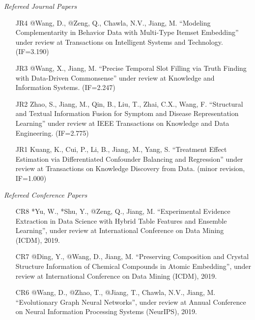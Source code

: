 \documentclass[10pt]{article}
\newenvironment{myindentpar}[1]%
{\begin{list}{}%
         {\setlength{\leftmargin}{#1}}%
         \item[]%
}
{\end{list}}
\newcounter{list}
\begin{document}
\begin{myindentpar}{0.00cm}

\hspace{-0.25cm}\emph{Refereed Journal Papers}

\begin{enumerate}[leftmargin=.5cm]

\item[JR4] @Wang, D., @Zeng, Q., Chawla, N.V., Jiang, M. ``Modeling Complementarity in Behavior Data with Multi-Type Itemset Embedding'' under review at Transactions on Intelligent Systems and Technology. (IF=3.190)

\item[JR3] @Wang, X., Jiang, M. ``Precise Temporal Slot Filling via Truth Finding with Data-Driven Commonsense'' under review at Knowledge and Information Systems. (IF=2.247)

\item[JR2] Zhao, S., Jiang, M., Qin, B., Liu, T., Zhai, C.X., Wang, F. ``Structural and Textual Information Fusion for Symptom and Disease Representation Learning'' under review at IEEE Transactions on Knowledge and Data Engineering. (IF=2.775)

\item[JR1] Kuang, K., Cui, P., Li, B., Jiang, M., Yang, S. ``Treatment Effect Estimation via Differentiated Confounder Balancing and Regression'' under review at Transactions on Knowledge Discovery from Data. (minor revision, IF=1.000)

\end{enumerate}

\vspace{.2cm}\hspace{-0.25cm}\emph{Refereed Conference Papers}

\begin{enumerate}[leftmargin=.5cm]

\item[CR8] *Yu, W., *Shu, Y., @Zeng, Q., Jiang, M. ``Experimental Evidence Extraction in Data Science with Hybrid Table Features and Ensemble Learning'', under review at International Conference on Data Mining (ICDM), 2019.

\item[CR7] @Ding, Y., @Wang, D., Jiang, M. ``Preserving Composition and Crystal Structure Information of Chemical Compounds in Atomic Embedding'', under review at International Conference on Data Mining (ICDM), 2019.

\item[CR6] @Wang, D., @Zhao, T., @Jiang, T., Chawla, N.V., Jiang, M. ``Evolutionary Graph Neural Networks'', under review at Annual Conference on Neural Information Processing Systems (NeurIPS), 2019.


\end{enumerate}
\end{myindentpar}
\end{document}
